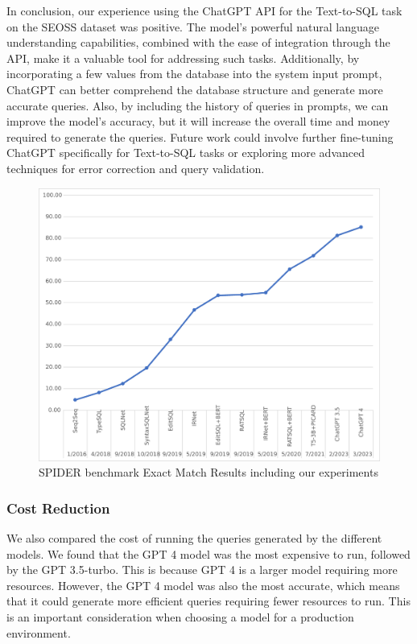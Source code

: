 In conclusion, our experience using the ChatGPT API for the Text-to-SQL task on the SEOSS dataset was positive. The model's powerful natural language understanding capabilities, combined with the ease of integration through the API, make it a valuable tool for addressing such tasks. Additionally, by incorporating a few values from the database into the system input prompt, ChatGPT can better comprehend the database structure and generate more accurate queries. Also, by including the history of queries in prompts, we can improve the model's accuracy, but it will increase the overall time and money required to generate the queries. Future work could involve further fine-tuning ChatGPT specifically for Text-to-SQL tasks or exploring more advanced techniques for error correction and query validation.

\begin{figure}[h]
    \centering
    \includegraphics[width=0.99\linewidth]{pics/benchmarkeps}
    \caption{SPIDER benchmark Exact Match Results including our experiments}
    \label{fig:benchmark}
\end{figure}

\subsubsection{Cost Reduction}

We also compared the cost of running the queries generated by the different models. We found that the GPT 4 model was the most expensive to run, followed by the GPT 3.5-turbo. This is because GPT 4 is a larger model requiring more resources. However, the GPT 4 model was also the most accurate, which means that it could generate more efficient queries requiring fewer resources to run. This is an important consideration when choosing a model for a production environment.

